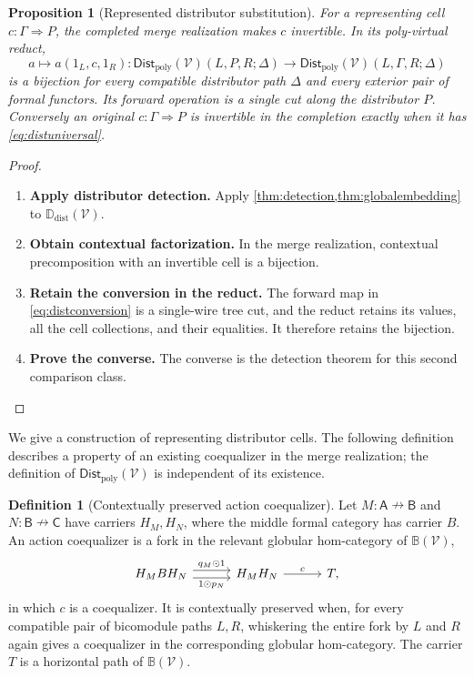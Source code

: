 \documentclass[11pt,reqno]{amsart}
\theoremstyle{plain}
\newtheorem{proposition}[theorem]{Proposition}
\theoremstyle{definition}
\newtheorem{definition}[theorem]{Definition}
\theoremstyle{remark}
\numberwithin{equation}{section}
\newcommand{\V}{\mathcal V}
\newcommand{\Ddist}{\mathbb D_{\mathrm{dist}}}
\newcommand{\FDist}{\mathsf{Dist}_{\mathrm{poly}}}
\newcommand{\harr}{\mathrel{\nrightarrow}}
\newcommand{\cell}{\mathrel{\Longrightarrow}}
\newcommand{\wh}{\mathbin{\odot}}
\begin{document}
\begin{proposition}[Represented distributor substitution]\label{prop:distrepresented}
For a representing cell $c:\Gamma\cell P$, the completed merge
realization makes $c$ invertible. In its poly-virtual reduct,
\begin{equation}\label{eq:distconversion}
 a\longmapsto a(1_L,c,1_R):
 \FDist(\V)(L,P,R;\Delta)
 \longrightarrow\FDist(\V)(L,\Gamma,R;\Delta)
\end{equation}
is a bijection for every compatible distributor path $\Delta$ and
every exterior pair of formal functors. Its forward operation is a
single cut along the distributor $P$. Conversely an original
$c:\Gamma\cell P$ is invertible in the completion exactly when it
has \cref{eq:distuniversal}.
\end{proposition}
\begin{proof}\leavevmode
\begin{enumerate}
\item \textbf{Apply distributor detection.} Apply \cref{thm:detection,thm:globalembedding} to $\Ddist(\V)$.

\item \textbf{Obtain contextual factorization.} In the merge realization, contextual precomposition with an invertible
cell is a bijection.

\item \textbf{Retain the conversion in the reduct.} The forward map in \cref{eq:distconversion} is
a single-wire tree cut, and the reduct retains its values, all the cell
collections, and their equalities. It therefore retains the bijection.

\item \textbf{Prove the converse.} The converse is the detection theorem for this second comparison class.\qedhere
\end{enumerate}
\end{proof}

We give a construction of representing distributor cells. The following
definition describes a property of an existing coequalizer in the merge
realization; the definition of $\FDist(\V)$ is independent of its
existence.

\begin{definition}[Contextually preserved action coequalizer]\label{def:distcoequalizer}
Let $M:\mathsf A\harr\mathsf B$ and
$N:\mathsf B\harr\mathsf C$ have carriers $H_M,H_N$, where the
middle formal category has carrier $B$. An action coequalizer is a fork
in the relevant globular hom-category of $\mathbb B(\V)$,
\begin{equation}\label{eq:distcoequalizer}
 \begin{tikzcd}[column sep=3em]
 H_M B H_N
 \arrow[r,shift left=.7ex,"q_M\wh1"]
 \arrow[r,shift right=.7ex,"1\wh p_N"'] &
 H_M H_N\arrow[r,"c"] &T,
 \end{tikzcd}
\end{equation}
in which $c$ is a coequalizer. It is contextually preserved when, for
every compatible pair of bicomodule paths $L,R$, whiskering the entire
fork by $L$ and $R$ again gives a coequalizer in the corresponding
globular hom-category. The carrier $T$ is a horizontal path of
$\mathbb B(\V)$.
\end{definition}
\end{document}
